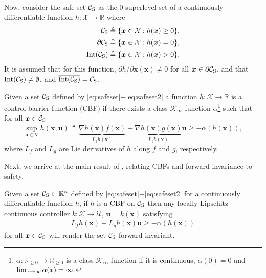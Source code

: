 Now, consider the safe set $\Cs$ as the 0-superlevel set of a continuously differentiable function $h : \mathcal{X} \rightarrow \mathbb{R}$ where
\begin{align} \label{eq:safeset}
    \Cs \triangleq \{\boldsymbol{x} \in \mathcal{X} : h(\boldsymbol{x}) \ge 0\}, \\ \partial\Cs \triangleq \{ \boldsymbol{x} \in \mathcal{X} : h(\boldsymbol{x})=0 \}, \\
    \text{Int}(\Cs) \triangleq \{\boldsymbol{x} \in \mathcal{X} : h(\boldsymbol{x}) > 0 \}. \label{eq:safeset2}
\end{align}
It is assumed that for this function, $\partial h/\partial \boldsymbol{x}(\boldsymbol{x}) \neq 0$ for all $\boldsymbol{x} \in \partial \Cs$, and that $\text{Int}(\Cs) \neq \emptyset$, and $\overline{\text{Int}(\Cs)} = \Cs$.
\begin{definition} \label{def:cbf}
    Given a set $\Cs$ defined by \eqref{eq:safeset}$-$\eqref{eq:safeset2} a function $h : \mathcal{X} \rightarrow \mathbb{R}$ is a control barrier function (CBF) if there exists a class-$\mathcal{K}_{\infty}$ function $\alpha$\footnote{$\alpha : \mathbb{R}_{\ge 0} \rightarrow \mathbb{R}_{\ge 0}$ is a class-$\mathcal{K}_{\infty}$ function if it is continuous, $\alpha(0)=0$ and $\text{lim}_{x \rightarrow \infty} \nspace{2}\alpha(x) = \infty$.} such that for all $\boldsymbol{x} \in \Cs$
\begin{equation}\label{eq:cbf_condition1}
    \sup_{\boldsymbol{u} \in \mathcal{U}} \dot{h}(\boldsymbol{x},\boldsymbol{u}) \triangleq \underbrace{\nabla h(\boldsymbol{x}) f(\boldsymbol{x})}_{ L_f h(\boldsymbol{x})} + \underbrace{\nabla h(\boldsymbol{x}) g(\boldsymbol{x})}_{L_g h (\boldsymbol{x})}\boldsymbol{u} \ge  -\alpha(h(\boldsymbol{x})),
\end{equation}
where $L_f$ and $L_g$ are Lie derivatives of $h$ along $f$ and $g$, respectively.
\end{definition}
Next, we arrive at the main result of \cite{ames_2017}, relating CBFs and forward invariance to safety.
\begin{theorem} \label{thm: cbf}
Given a set $\Cs \subset \mathbb{R}^n$ defined by \eqref{eq:safeset}$-$\eqref{eq:safeset2} for a continuously differentiable function $h$, if $h$ is a CBF on $\Cs$ then any locally Lipschitz continuous controller $k:\mathcal{X} \rightarrow \mathcal{U}$, $\boldsymbol{u}=k(\boldsymbol{x})$ satisfying 
\begin{align} \label{eq: cbf_condition}
    L_f h(\boldsymbol{x}) + L_g h (\boldsymbol{x}) \boldsymbol{u} \ge -\alpha(h(\boldsymbol{x}))
\end{align}
for all $\boldsymbol{x} \in \Cs$ will render the set $\Cs$ forward invariant.
\end{theorem}

